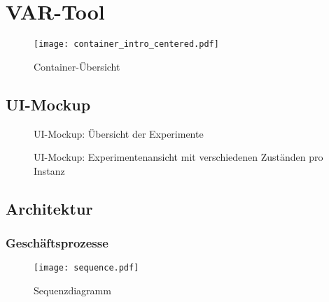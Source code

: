 \chapter{VAR-Tool}
\label{ch:main-matter}
  \begin{figure}[H]
    \centering
    \texttt{[image: container\_intro\_centered.pdf]}
    \par
    \caption{Container-Übersicht}
    \label{fig:container-intro}
  \end{figure}
  \clearpage


\section{UI-Mockup}
\begin{landscape}
  \begin{figure}[h]
    \centering
    \par
    \caption{UI-Mockup: Übersicht der Experimente}
    \label{fig:ui-mockup-1}
  \end{figure}
  \begin{figure}[h]
    \centering
    \par
    \caption{UI-Mockup: Experimentenansicht mit verschiedenen Zuständen pro Instanz}
    \label{fig:ui-mockup-2}
  \end{figure}
\end{landscape}

\section{Architektur}

\subsection{Geschäftsprozesse}
\begin{landscape}
  \begin{figure}[h]
    \centering
    \texttt{[image: sequence.pdf]}
    \par
    \caption{Sequenzdiagramm}
    \label{fig:sequence}
  \end{figure}
\end{landscape}

